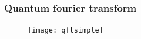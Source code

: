 \begin{frame}
	\frametitle{Quantum fourier transform}
		\framesubtitle{}

		\begin{figure}
		\centering
			\texttt{[image: qftsimple]}
			\label{fig:qft qft}
		\end{figure}
		

\end{frame}
